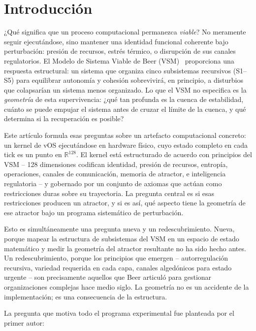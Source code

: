 \documentclass[11pt, a4paper]{article}
\newcommand{\R}{\mathbb{R}}
\newcommand{\vOS}{\textsf{vOS}}
\begin{document}
\tableofcontents
\newpage


\section{Introducción}
\label{sec:intro}

¿Qué significa que un proceso computacional permanezca \emph{viable}?
No meramente seguir ejecutándose, sino mantener una identidad funcional coherente
bajo perturbación: presión de recursos, estrés térmico, o disrupción de sus
canales regulatorios.
El Modelo de Sistema Viable de Beer (VSM)~\cite{beer1972brain} proporciona una respuesta
estructural: un sistema que organiza cinco subsistemas recursivos (S1--S5) para
equilibrar autonomía y cohesión sobrevivirá, en principio, a disturbios que
colapsarían un sistema menos organizado.
Lo que el VSM no especifica es la \emph{geometría} de esta supervivencia:
¿qué tan profunda es la cuenca de estabilidad, cuánto se puede empujar el sistema antes de
cruzar el límite de la cuenca, y qué determina si la recuperación es posible?

Este artículo formula esas preguntas sobre un artefacto computacional concreto:
un kernel de \vOS{} ejecutándose en hardware físico, cuyo estado completo en cada
tick es un punto en $\R^{128}$.
El kernel está estructurado de acuerdo con principios del VSM -- 128 dimensiones
codifican identidad, presión de recursos, entropía, operaciones, canales de
comunicación, memoria de atractor, e inteligencia regulatoria -- y gobernado por
un conjunto de axiomas que actúan como restricciones duras sobre su trayectoria.
La pregunta central es si esas restricciones producen un atractor,
y si es así, qué aspecto tiene la geometría de ese atractor bajo un
programa sistemático de perturbación.

Esto es simultáneamente una pregunta nueva y un redescubrimiento.
Nueva, porque mapear la estructura de subsistemas del VSM en un espacio de estado
matemático y medir la geometría del atractor resultante no ha sido hecho
antes.
Un redescubrimiento, porque los principios que emergen -- autorregulación
recursiva, variedad requerida en cada capa, canales algedónicos para
estado urgente -- son precisamente aquellos que Beer articuló para gestionar
organizaciones complejas hace medio siglo.
La geometría no es un accidente de la implementación; es una consecuencia
de la estructura.

La pregunta que motiva todo el programa experimental fue planteada por
el primer autor:
\end{document}
